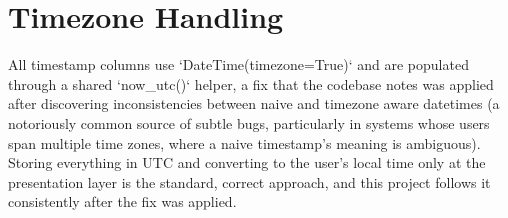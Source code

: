 \documentclass[11pt,a4paper]{report}
\begin{document}
\section{Timezone Handling}

All timestamp columns use `DateTime(timezone=True)` and are populated through a shared `now_utc()` helper, a fix that the codebase notes was applied after discovering inconsistencies between naive and timezone aware datetimes (a notoriously common source of subtle bugs, particularly in systems whose users span multiple time zones, where a naive timestamp's meaning is ambiguous). Storing everything in UTC and converting to the user's local time only at the presentation layer is the standard, correct approach, and this project follows it consistently after the fix was applied.
\end{document}

